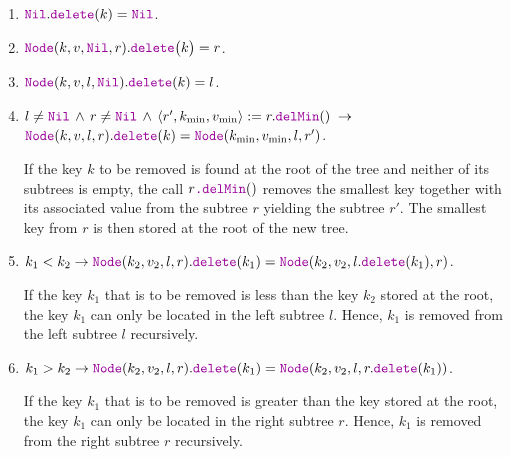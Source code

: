 \begin{enumerate}
\item $\mytt{Nil}.\mytt{delete}(k) = \mytt{Nil}$.
\item $\mytt{Node}(k,v,\mytt{Nil},r).\mytt{delete}\bigl(k\bigr) = r$.
\item $\mytt{Node}(k,v,l,\mytt{Nil}).\mytt{delete}(k) = l$.
\item $l \not= \mytt{Nil} \,\wedge\, r \not= \mytt{Nil} \,\wedge\, \langle r',k_{\textrm{min}}, v_{\textrm{min}}\rangle := r.\mytt{delMin}() \;\rightarrow$ \\[0.2cm]
      \hspace*{1.3cm}
      $\mytt{Node}(k,v,l,r).\mytt{delete}(k) = \mytt{Node}(k_{\textrm{min}},v_{\textrm{min}},l,r')$.
      
      If the key $k$ to be removed is found at the root of the tree and neither of its subtrees is
      empty, the call  $r\mytt{.}\mytt{delMin}()$ removes the smallest key together with its
      associated value from the subtree $r$ yielding the subtree $r'$.
      The smallest key from $r$ is then stored at the root of the new tree.

\item $k_1 < k_2 \rightarrow \mytt{Node}(k_2,v_2,l,r).\mytt{delete}(k_1) = 
       \mytt{Node}(k_2,v_2,l.\mytt{delete}(k_1),r)$.

       If the key $k_1$ that is to be removed is less than the key $k_2$ stored at the root, the key $k_1$ can only be
       located in the left subtree $l$.  Hence, $k_1$ is removed from the left subtree $l$ recursively.
\item $k_1 > k_2 \rightarrow \mytt{Node}(k_2,v_2,l,r).\mytt{delete}(k_1) = 
       \mytt{Node}(k_2,v_2,l,r.\mytt{delete}(k_1))$.

       If the key $k_1$ that is to be removed is greater than the key stored at the root, the key $k_1$ can only be
       located in the right subtree $r$.  Hence, $k_1$ is removed from the right subtree $r$ recursively.
\end{enumerate}

